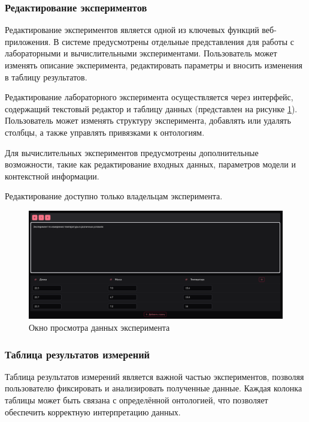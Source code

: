 \subsubsection{Редактирование экспериментов}

Редактирование экспериментов является одной из ключевых функций веб-приложения. В системе предусмотрены отдельные представления для работы с лабораторными и вычислительными экспериментами. Пользователь может изменять описание эксперимента, редактировать параметры и вносить изменения в таблицу результатов.

Редактирование лабораторного эксперимента осуществляется через интерфейс, содержащий текстовый редактор и таблицу данных (представлен на рисунке \ref{pic:lab_experiment_editor}). Пользователь может изменять структуру эксперимента, добавлять или удалять столбцы, а также управлять привязками к онтологиям.

Для вычислительных экспериментов предусмотрены дополнительные возможности, такие как редактирование входных данных, параметров модели и контекстной информации.

Редактирование доступно только владельцам эксперимента.

\begin{figure}[H]
    \centering
    \includegraphics[width=\linewidth]{img/experiment_view.png}
    \caption{Окно просмотра данных эксперимента}
    \label{pic:lab_experiment_editor}
\end{figure}
\vspace{0.5cm}

\subsubsection{Таблица результатов измерений}

Таблица результатов измерений является важной частью экспериментов, позволяя пользователю фиксировать и анализировать полученные данные. Каждая колонка таблицы может быть связана с определённой онтологией, что позволяет обеспечить корректную интерпретацию данных.

